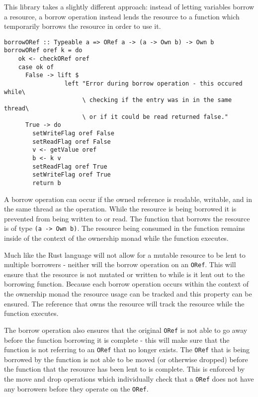 \documentclass[onehalf,11pt]{beavtex}
\begin{document}
This library takes a slightly different approach: instead of letting variables
borrow a resource, a borrow operation instead lends the resource to a function
which temporarily borrows the resource in order to use it.

\begin{verbatim}
borrowORef :: Typeable a => ORef a -> (a -> Own b) -> Own b
borrowORef oref k = do
    ok <- checkORef oref
    case ok of
      False -> lift $
                 left "Error during borrow operation - this occured while\
                      \ checking if the entry was in in the same thread\
                      \ or if it could be read returned false."
      True -> do
        setWriteFlag oref False
        setReadFlag oref False
        v <- getValue oref
        b <- k v
        setReadFlag oref True
        setWriteFlag oref True
        return b
\end{verbatim}

A borrow operation can occur if the owned reference is readable, writable, and
in the same thread as the operation.
While the resource is being borrowed it is prevented from being written to or
read.
The function that borrows the resource is of type \texttt{(a -> Own b)}. The
resource being consumed in the function remains inside of the context of the
ownership monad while the function executes. %

Much like the Rust language will not allow for a mutable resource to be lent to
multiple borrowers - neither will the borrow operation on an \texttt{ORef}.
This will ensure that the resource is not mutated or written to while is it lent
out to the borrowing function.
Because each borrow operation occurs within the context of the ownership monad
the resource usage can be tracked and this property can be ensured. The
reference that owns the resource will track the resource while the function
executes.

The borrow operation also ensures that the original \texttt{ORef} is not able to
go away before the function borrowing it is complete - this will make sure that
the function is not referring to an \texttt{ORef} that no longer exists.
The \texttt{ORef} that is being borrowed by the function is not able to be moved
(or otherwise dropped) before the function that the resource has been lent to is
complete. This is enforced by the move and drop operations which individually
check that a \texttt{ORef} does not have any borrowers before they operate on
the \texttt{ORef}.
\end{document}
